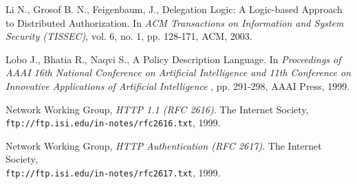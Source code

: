 \documentclass[11pt, twocolumn]{article}
\begin{document}
\begin{thebibliography}{5}
      Li N., Grosof B. N., Feigenbaum, J.,
      Delegation Logic: A Logic-based Approach to Distributed Authorization.
      In {\em ACM Transactions on Information and System Security (TISSEC)},
      vol. 6, no. 1, pp. 128-171, ACM, 2003.

      Lobo J., Bhatia R., Naqvi S.,
      A Policy Description Language.
      In {\em Proceedings of AAAI 16th National Conference on Artificial
      Intelligence and 11th Conference on Innovative Applications of Artificial
      Intelligence }, pp. 291-298, AAAI Press, 1999.

      Network Working Group,
      {\em HTTP 1.1 (RFC 2616)}.
      The Internet Society, \\
      {\scriptsize \tt ftp://ftp.isi.edu/in-notes/rfc2616.txt},
      1999.

      Network Working Group,
      {\em HTTP Authentication (RFC 2617)}.
      The Internet Society, \\
      {\scriptsize \tt ftp://ftp.isi.edu/in-notes/rfc2617.txt},
      1999.
  \end{thebibliography}
\end{document}
